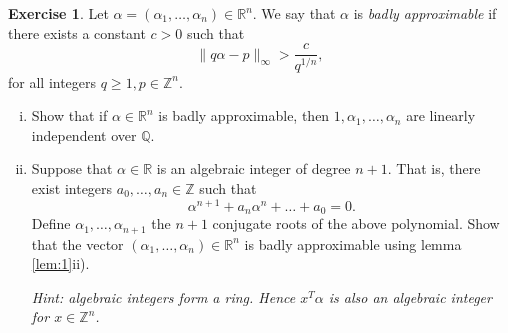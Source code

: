 \documentclass[12pt,a4paper]{article}
\theoremstyle{plain}
\newtheorem*{Sol*}{Solution}
\theoremstyle{definition}
\newtheorem{Ex}{Exercise}
\def \Q {\mathbb Q}
\def \R {\mathbb R}
\def \Z {\mathbb Z}
\newif\ifsolutions
\newcommand{\exercise}[2]{
			\begin{Ex} #1 \end{Ex}
			\ifsolutions  \begin{Sol*} #2 \end{Sol*} \bigskip \else \bigskip  \fi
		}
\begin{document}
\exercise{
	Let $\alpha = (\alpha_1, \dots, \alpha_n) \in \R^n$. We say that $\alpha$ is \emph{badly approximable} if there exists a constant $c > 0$ such that
		\[ \| q \alpha - p \|_\infty > \frac{c}{q^{1/n}}, \]
	for all integers $q \geq 1, p \in \Z^n$.

	\begin{enumerate}[i)]
		\item Show that if $\alpha \in \R^n$ is badly approximable, then $1, \alpha_1, \dots, \alpha_n$ are linearly independent over $\Q$.
		\item Suppose that $\alpha \in \R$ is an algebraic integer of degree $n+1$. That is, there exist integers $a_0, \dots, a_{n} \in \Z$ such that
			\[ \alpha^{n+1} + a_{n} \alpha^{n} + \dots +  a_{0} = 0. \]
		Define $\alpha_1, \dots, \alpha_{n+1}$ the $n+1$ conjugate roots of the above polynomial.
		Show that the vector $(\alpha_1, \dots, \alpha_n) \in \R^n$ is badly approximable using lemma \ref{lem:1}ii).

		\emph{Hint: algebraic integers form a ring. Hence $x^T \alpha$ is also an algebraic integer for $x \in \Z^n$.}
	\end{enumerate}
}
{
	\begin{enumerate}[i)]
		\item Notice that the direction ii) $\implies$ i) of exercise 4 does not use the linear independence of $1, \alpha_1, \dots, \alpha_n$ over $\Q$.
			In fact, given $x \in \Z^n \setminus \{0\}$, $y\in\Z$ such that $x^T \alpha -y = 0$, one may find integers $q \geq 1, p\in\Z^n$ such that
				\[ \| q \alpha - p \|_\infty \leq \frac{c_1}{q^{1/n}}, \]
			where $c_1$ is as small as required. 
			This contradicts the assumption that $\alpha$ is badly approximable.

		\item By the hint, $x^T\alpha - y$ is an algebraic integer of degree $n+1$ for each $x \in \Z^n \setminus \{0\}, y\in\Z$.
			Fix $M = \max\{ | \alpha_1|, \dots, | \alpha_{n+1} |\}$, and consider the norm of $x^T\alpha - y$.

			By Galois theory, the norm is integer, and given by the product over all images by the Galois group automorphisms of the field extension.
			Since the automorphism only permute the roots, sending one conjugate of $\alpha$ to another, we get
				\[ | \sigma(x^T\alpha - y) | = | \sum_{i=1}^n x_i \sigma(\alpha_i) - y | \leq n \| x \|_\infty M + |y| \leq \| x \|_\infty \left( 1 + 2 n M \right), \]
			where we've used that $|y| \leq (1 + nM)\|x \|_\infty$ whenever $| x^T\alpha - y| \leq 1$. 
		
				\[ | N(x^T \alpha - y) | = | x^T \alpha - y | \cdot \prod_{\sigma \neq id} | \sigma(x^T\alpha - y) | \leq | x^T \alpha - y |  \cdot \| x \|_\infty^n ( 1 + 2 n M)^n. \]
			To conclude, we use that the norm is a non-zero integer, by linear independence and the fact that it is an algebraic integer.
			This implies $| N(x^T \alpha - y) | \geq 1$, and shows that Lemma~\ref{lem:1}ii) cannot hold for $c$ small enough.

	\end{enumerate}
}
\end{document}
